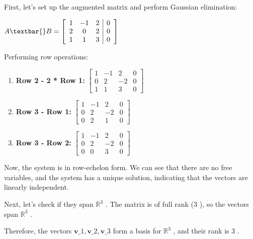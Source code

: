 \documentclass[11pt]{article}
\makeatletter
\newcommand{\boxspacing}{\kern\kvtcb@left@rule\kern\kvtcb@boxsep}
\newcommand{\prompt}[4]{
        {\ttfamily\llap{{\color{#2}[#3]:\hspace{3pt}#4}}\vspace{-\baselineskip}}
    }
\makeatother
\begin{document}
First, let's set up the augmented matrix and perform Gaussian
elimination:

$  A \textbar{} B =\left[ \begin{array}{ccc|c} 1 & -1 & 2 & 0 \\ 2 & 0 & 2 & 0 \\ 1 & 1 & 3 & 0 \end{array} \right] $ 

Performing row operations:

\begin{enumerate}
\def\labelenumi{\arabic{enumi}.}
\item
  \textbf{Row 2 - 2 * Row 1:} $ 
  \left[ \begin{array}{ccc|c} 1 & -1 & 2 & 0 \\ 0 & 2 & -2 & 0 \\ 1 & 1 & 3 & 0 \end{array} \right] $ 
\item
  \textbf{Row 3 - Row 1:} $ 
  \left[ \begin{array}{ccc|c} 1 & -1 & 2 & 0 \\ 0 & 2 & -2 & 0 \\ 0 & 2 & 1 & 0 \end{array} \right] $ 
\item
  \textbf{Row 3 - Row 2:} $ 
  \left[ \begin{array}{ccc|c} 1 & -1 & 2 & 0 \\ 0 & 2 & -2 & 0 \\ 0 & 0 & 3 & 0 \end{array} \right] $ 
\end{enumerate}

Now, the system is in row-echelon form. We can see that there are no
free variables, and the system has a unique solution, indicating that
the vectors are linearly independent.

Next, let's check if they span $  \mathbb{R}^3$  . The matrix is of
full rank ($  3$  ), so the vectors span $  \mathbb{R}^3$  .

Therefore, the vectors $  \mathbf{v}\_1, \mathbf{v}\_2, \mathbf{v}\_3$ 
form a basis for $  \mathbb{R}^3$  , and their rank is $  3$  .

    \begin{tcolorbox}[breakable, size=fbox, boxrule=1pt, pad at break*=1mm,colback=cellbackground, colframe=cellborder]
\prompt{In}{incolor}{ }{\boxspacing}
\begin{Verbatim}[commandchars=\\\{\}]

\end{Verbatim}
\end{tcolorbox}
\end{document}
